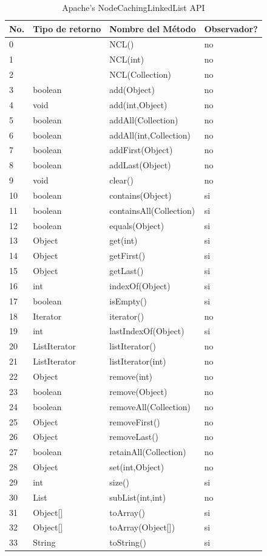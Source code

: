 




\begin{table}[H]
\center
{\scriptsize
\begin{tabular}{|l|l|l|l|}
\hline
No. &Tipo de retorno & Nombre del Método & Observador? \\
\hline
    0 && NCL() & no \\
    1& & NCL(int) & no \\
    2&& NCL(Collection) & no \\
    3&boolean & add(Object) & no \\
    4&void&add(int,Object) & no \\
    5&boolean&addAll(Collection) & no\\
    6&boolean&addAll(int,Collection) & no \\
    7&boolean&addFirst(Object) & no \\
    8&boolean&addLast(Object) & no\\
    9&void&clear() & no\\
    10&boolean&contains(Object) & si \\
    11&boolean&containsAll(Collection) & si \\
    12&boolean&equals(Object) & si \\
    13&Object&get(int) & si\\
    14&Object&getFirst() & si \\
    15&Object&getLast() & si\\
    16&int&indexOf(Object) & si\\
    17&boolean&isEmpty() & si\\
    18&Iterator&iterator() & no\\
    19&int&lastIndexOf(Object) & si \\
    20&ListIterator&listIterator() &no \\
    21&ListIterator&listIterator(int) & no\\
    22&Object&remove(int) &no\\
    23&boolean&remove(Object) & no \\
    24&boolean&removeAll(Collection) & no \\
    25&Object&removeFirst() &no\\
    26&Object&removeLast() &no\\
    27&boolean&retainAll(Collection) &no \\
    28&Object&set(int,Object) &no\\
    29&int&size() &si \\
    30&List&subList(int,int) & no \\
    31&Object[]&toArray() & si \\
    32&Object[]&toArray(Object[]) &si\\
    33&String&toString() & si \\
\hline
\end{tabular}
}
\caption{Apache's NodeCachingLinkedList API}
\label{tab:ncl-api}
\end{table} 

